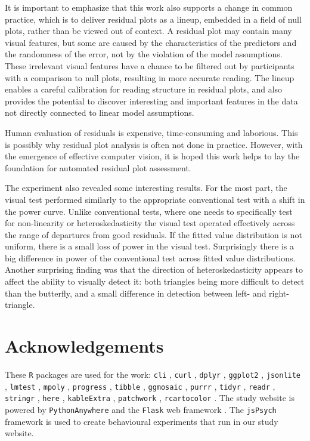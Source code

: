 \documentclass[]{interact}
\theoremstyle{plain}%
\theoremstyle{definition}
\theoremstyle{remark}
\begin{document}
It is important to emphasize that this work also supports a change in
common practice, which is to deliver residual plots as a lineup,
embedded in a field of null plots, rather than be viewed out of context.
A residual plot may contain many visual features, but some are caused by
the characteristics of the predictors and the randomness of the error,
not by the violation of the model assumptions. These irrelevant visual
features have a chance to be filtered out by participants with a
comparison to null plots, resulting in more accurate reading. The lineup
enables a careful calibration for reading structure in residual plots,
and also provides the potential to discover interesting and important
features in the data not directly connected to linear model assumptions.

Human evaluation of residuals is expensive, time-consuming and
laborious. This is possibly why residual plot analysis is often not done
in practice. However, with the emergence of effective computer vision,
it is hoped this work helps to lay the foundation for automated residual
plot assessment.

The experiment also revealed some interesting results. For the most
part, the visual test performed similarly to the appropriate
conventional test with a shift in the power curve. Unlike conventional
tests, where one needs to specifically test for non-linearity or
heteroskedasticity the visual test operated effectively across the range
of departures from good residuals. If the fitted value distribution is
not uniform, there is a small loss of power in the visual test.
Surprisingly there is a big difference in power of the conventional test
across fitted value distributions. Another surprising finding was that
the direction of heteroskedasticity appears to affect the ability to
visually detect it: both triangles being more difficult to detect than
the butterfly, and a small difference in detection between left- and
right-triangle.

\hypertarget{acknowledgements}{%
\section*{Acknowledgements}\label{acknowledgements}}

These \texttt{R} packages are used for the work: \texttt{cli}
\citep{cli}, \texttt{curl} \citep{curl}, \texttt{dplyr} \citep{dplyr},
\texttt{ggplot2} \citep{ggplot2}, \texttt{jsonlite} \citep{jsonlite},
\texttt{lmtest} \citep{lmtest}, \texttt{mpoly} \citep{mpoly},
\texttt{progress} \citep{progress}, \texttt{tibble} \citep{tibble},
\texttt{ggmosaic} \citep{ggmosaic}, \texttt{purrr} \citep{purrr},
\texttt{tidyr} \citep{tidyr}, \texttt{readr} \citep{readr},
\texttt{stringr} \citep{stringr}, \texttt{here} \citep{here},
\texttt{kableExtra} \citep{kableextra}, \texttt{patchwork}
\citep{patchwork}, \texttt{rcartocolor} \citep{rcartocolor}. The study
website is powered by \texttt{PythonAnywhere} \citep{pythonanywhere} and
the \texttt{Flask} web framework \citep{flask}. The \texttt{jsPsych}
framework \citep{jspsych} is used to create behavioural experiments that
run in our study website.
\end{document}
